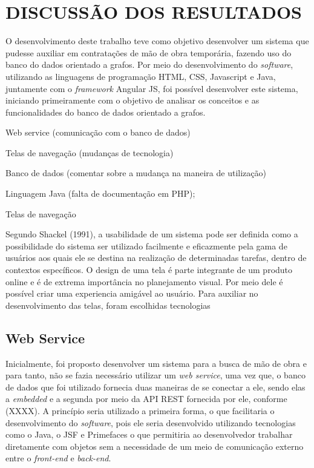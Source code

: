 
\chapter{DISCUSSÃO DOS RESULTADOS} 

\par O desenvolvimento deste trabalho teve como objetivo desenvolver um sistema que pudesse auxiliar em contratações de mão de obra temporária, fazendo uso do banco do dados orientado a grafos. Por meio do desenvolvimento do \textit{software}, utilizando as linguagens de programação HTML, CSS, Javascript e Java, juntamente com o \textit{framework} Angular JS, foi possível desenvolver este sistema, iniciando primeiramente com o objetivo de analisar os conceitos e as funcionalidades do banco de dados orientado a grafos.

\par Web service (comunicação com o banco de dados)
\par Telas de navegação (mudanças de tecnologia)
\par Banco de dados (comentar sobre a mudança na maneira de utilização)
\par Linguagem Java (falta de documentação em PHP);


\par Telas de navegação

\par Segundo Shackel (1991), a usabilidade de um sistema pode ser definida como a possibilidade do sistema ser utilizado facilmente e eficazmente pela gama de usuários aos quais ele se destina na realização de determinadas tarefas, dentro de contextos específicos.  O design de uma tela é parte integrante de um produto online e é de extrema importância no planejamento visual. Por meio dele é possível criar uma experiencia amigável ao usuário. Para auxiliar no desenvolvimento das telas, foram escolhidas tecnologias  


\section{Web Service}

\par Inicialmente, foi proposto desenvolver um sistema para a busca de mão de obra e para tanto, não se fazia necessário utilizar um \textit{web service}, uma vez que, o banco de dados que foi utilizado fornecia duas maneiras de se conectar a ele, sendo elas a \textit{embedded} e a segunda por meio da API REST fornecida por ele, conforme (XXXX). A princípio seria utilizado a primeira forma, o que facilitaria o desenvolvimento do \textit{software}, pois ele seria desenvolvido utilizando tecnologias como o Java, o JSF e Primefaces o que permitiria ao desenvolvedor trabalhar diretamente com objetos sem a necessidade de um meio de comunicação externo entre o \textit{front-end} e \textit{back-end}.

